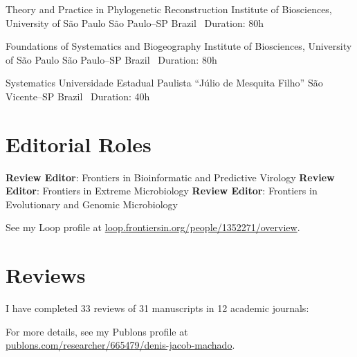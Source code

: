 \documentclass[11pt, letterpaper, sans]{moderncv}
\begin{document}
		{Theory and Practice in Phylogenetic Reconstruction}
		{Institute of Biosciences, University of São Paulo}
		{São Paulo--SP}
		{Brazil}
		{
			\textbullet~Duration: 80h
		}

		{Foundations of Systematics and Biogeography}
		{Institute of Biosciences, University of São Paulo}
		{São Paulo--SP}
		{Brazil}
		{
			\textbullet~Duration: 80h
		}

		{Systematics}
		{Universidade Estadual Paulista ``Júlio de Mesquita Filho''}
		{São Vicente--SP}
		{Brazil}
		{
			\textbullet~Duration: 40h
		}


\section{Editorial Roles}

	    {\textbf{Review Editor}: Frontiers in Bioinformatic and Predictive Virology}
	\cvline{---}
	    {\textbf{Review Editor}: Frontiers in Extreme Microbiology}
	\cvline{---}
	    {\textbf{Review Editor}: Frontiers in Evolutionary and Genomic Microbiology}

\vspace{0.5em}

See my Loop profile at  \href{https://loop.frontiersin.org/people/1352271/overview}{loop.frontiersin.org/people/1352271/overview}.

\section{Reviews}

    I have completed 33 reviews of 31 manuscripts in 12 academic journals:\\
    \begin{multicols}{2}
    {\footnotesize
    }
    \end{multicols}
    For more details, see my Publons profile at  \href{https://publons.com/researcher/665479/denis-jacob-machado/}{publons.com/researcher/665479/denis-jacob-machado}.
\end{document}

